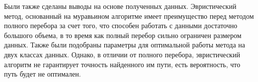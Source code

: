 \documentclass[a4paper,14pt]{extreport}
\begin{document}
Были также сделаны выводы на основе полученных данных.
Эвристический метод, основанный на муравьином алгоритме имеет преимущество перед методом полного перебора за счет того, что способен работать с данными достаточно большого объема, в то время как полный перебор сильно ограничен размером данных.
Также были подобраны параметры для оптимальной работы метода на двух классах данных.
Однако, в отличии от полного перебора, эвристический алгоритм не гарантирует точность найденного им пути, есть вероятность, что путь будет не оптимален.


\end{document}
